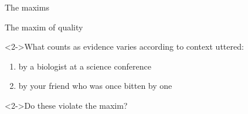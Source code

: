 \documentclass{beamer}
\newcommand{\subonetwo}{The maxims}
\begin{document}
      \begin{frame}[t]{\subonetwo}
        \begin{alertblock}{The maxim of quality}
          
        \end{alertblock}
        \begin{block}<2->{What counts as evidence varies according to context}
           uttered:
          \begin{enumerate}
            \item by a biologist at a science conference
            \item by your friend who was once bitten by one
          \end{enumerate}
        \end{block}
        \begin{block}<2->{Do these violate the maxim?}
        \end{block}
      \end{frame}
\end{document}
